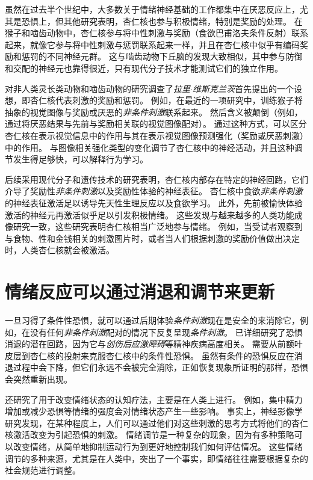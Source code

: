 虽然在过去半个世纪中，大多数关于情绪神经基础的工作都集中在厌恶反应上，尤其是恐惧上，但其他研究表明，杏仁核也参与积极情绪，特别是奖励的处理。
在猴子和啮齿动物中，杏仁核参与将中性刺激与奖励（食欲巴甫洛夫条件反射）联系起来，就像它参与将中性刺激与惩罚联系起来一样，并且在杏仁核中似乎有编码奖励和惩罚的不同神经元群。
这与啮齿动物下丘脑的发现大致相似，其中参与防御和交配的神经元也靠得很近，只有现代分子技术才能测试它们的独立作用。


对非人类灵长类动物和啮齿动物的研究调查了\textit{拉里$\cdot$维斯克兰茨}首先提出的一个设想，即杏仁核代表刺激的奖励和惩罚。
例如，在最近的一项研究中，训练猴子将抽象的视觉图像与奖励或厌恶的\textit{非条件刺激}联系起来。
然后含义被颠倒（例如，通过将厌恶结果与先前与奖励相关联的视觉图像配对）。
通过这种方式，可以区分杏仁核在表示视觉信息中的作用与其在表示视觉图像预测强化（奖励或厌恶刺激）中的作用。
与图像相关强化类型的变化调节了杏仁核中的神经活动，并且这种调节发生得足够快，可以解释行为学习。


后续采用现代分子和遗传技术的研究表明，杏仁核内部存在特定的神经回路，它们介导了奖励性\textit{非条件刺激}以及奖励性体验的神经表征。
杏仁核中食欲\textit{非条件刺激}的神经表征激活足以诱导先天性生理反应以及食欲学习。
此外，先前被愉快体验激活的神经元再激活似乎足以引发积极情绪。
这些发现与越来越多的人类功能成像研究一致，这些研究表明杏仁核相当广泛地参与情绪。
例如，当受试者观察到与食物、性和金钱相关的刺激图片时，或者当人们根据刺激的奖励价值做出决定时，人类杏仁核就会被激活。



\section{情绪反应可以通过消退和调节来更新}

一旦习得了条件性恐惧，就可以通过后期体验\textit{条件刺激}现在是安全的来消除它，例如，在没有任何\textit{非条件刺激}配对的情况下反复呈现\textit{条件刺激}。
已详细研究了恐惧消退的潜在回路，因为它与\textit{创伤后应激障碍}等精神疾病高度相关。
需要从前额叶皮层到杏仁核的投射来克服杏仁核中的条件性恐惧。
虽然有条件的恐惧反应在消退过程中会下降，但它们永远不会被完全消除，正如恢复现象所证明的那样，恐惧会突然重新出现。


还研究了用于改变情绪状态的认知疗法，主要是在人类上进行。
例如，集中精力增加或减少恐惧等情绪的强度会对情绪状态产生一些影响。
事实上，神经影像学研究发现，在某种程度上，人们可以通过他们对这些刺激的思考方式将他们的杏仁核激活改变为引起恐惧的刺激。
情绪调节是一种复杂的现象，因为有多种策略可以改变情绪，从简单地抑制运动行为到更好地控制我们如何评估情况。
这些情绪调节的多种来源，尤其是在人类中，突出了一个事实，即情绪往往需要根据复杂的社会规范进行调整。



